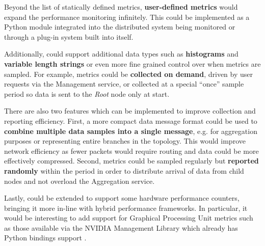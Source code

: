 Beyond the list of statically defined metrics, \textbf{user-defined metrics} would expand the performance monitoring
infinitely. This could be implemented as a Python module integrated into the distributed system being monitored or
through a plug-in system built into \dcamp itself.

Additionally, \dcamp could support additional data types such as \textbf{histograms} and \textbf{variable length
strings} or even more fine grained control over when metrics are sampled. For example, metrics could be
\textbf{collected on demand}, driven by user requests via the Management service, or collected at a special ``once''
sample period so data is sent to the \textit{Root} node only at start.

There are also two features which can be implemented to improve collection and reporting efficiency. First, a more
compact data message format could be used to \textbf{combine multiple data samples into a single message}, e.g. for
aggregation purposes or representing entire branches in the topology. This would improve network efficiency as fewer
packets would require routing and data could be more effectively compressed. Second, metrics could be sampled regularly
but \textbf{reported randomly} within the period in order to distribute arrival of data from child nodes and not
overload the Aggregation service.

Lastly, \dcamp could be extended to support some hardware performance counters, bringing it more in-line with hybrid
performance frameworks. In particular, it would be interesting to add support for Graphical Processing Unit metrics such
as those available via the NVIDIA Management Library\cite{nvidiaML} which already has Python bindings support
\cite{py-nvidia}.
